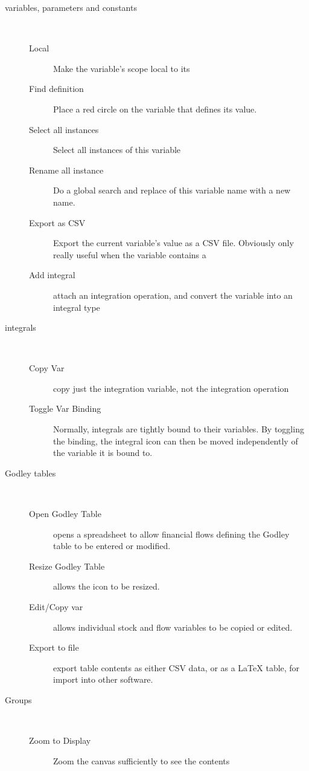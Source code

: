 \begin{description}
\item [{variables, parameters and constants}] %
\mbox{%
%
} 
\begin{description}
\item [{Local}] Make the variable's scope local to its  
\item [{Find definition}] Place a red circle on the variable that defines
its value. 
\item [{Select all instances}] Select all instances of this variable 
\item [{Rename all instance}] Do a global search and replace of this variable
name with a new name. 
\item [{Export as CSV}] Export the current variable's value as a CSV file.
Obviously only really useful when the variable contains a  
\item [{Add integral}] attach an integration operation, and convert the
variable into an integral type 
\end{description}
\item [{integrals}] %
\mbox{%
%
} 
\begin{description}
\item [{Copy Var}] copy just the integration variable, not the integration
operation 
\item [{Toggle Var Binding}] Normally, integrals are tightly bound to
their variables. By toggling the binding, the integral icon can then
be moved independently of the variable it is bound to. 
\end{description}
\item [{Godley tables}] %
\mbox{%
%
} 
\begin{description}
\item [{Open Godley Table}] opens a spreadsheet to allow financial flows
defining the Godley table to be entered or modified. 
\item [{Resize Godley Table}] allows the icon to be resized. 
\item [{Edit/Copy var}] allows individual stock and flow variables to
be copied or edited. 
\item [{Export to file}] export table contents as either CSV data, or
as a LaTeX table, for import into other software. 
\end{description}
\item [{Groups}] %
\mbox{%
%
} 
\begin{description}
\item [{Zoom to Display}] Zoom the canvas sufficiently to see the contents

\end{description}
\end{description}
